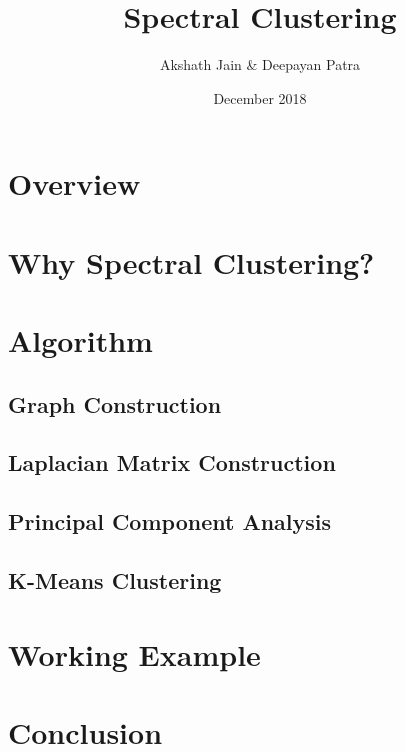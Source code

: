 \documentclass{article}
\title{Spectral Clustering}
\author{Akshath Jain \& Deepayan Patra}
\date{December 2018}
\begin{document}
\maketitle

\section{Overview}

\section{Why Spectral Clustering?}

\section{Algorithm}
\subsection{Graph Construction}
\subsection{Laplacian Matrix Construction}
\subsection{Principal Component Analysis}
\subsection{K-Means Clustering}

\section{Working Example}

\section{Conclusion}



\end{document}
